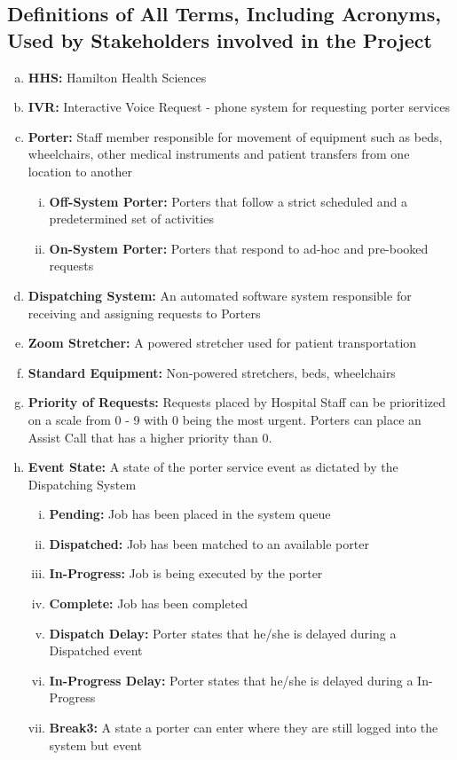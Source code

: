 \documentclass[paper=letter, fontsize=10pt]{scrartcl}
\numberwithin{equation}{section}		%
\numberwithin{figure}{section}			%
\numberwithin{table}{section}				%
\begin{document}
\subsection{Definitions of All Terms, Including Acronyms, Used by Stakeholders involved in the Project}
\begin{enumerate}[(a)]
	\item \textbf{HHS:} Hamilton Health Sciences
	\item \textbf{IVR:} Interactive Voice Request - phone system for requesting porter services
	\item \textbf{Porter:} Staff member responsible for movement of equipment such as beds, wheelchairs, other medical instruments and patient transfers from one location to another
	\begin{enumerate}[(i)]
		\item \textbf{Off-System Porter:} Porters that follow a strict scheduled and a predetermined set of activities
		\item \textbf{On-System Porter:} Porters that respond to ad-hoc and pre-booked requests	
	\end{enumerate}
	\item \textbf{Dispatching System:} An automated software system responsible for receiving and assigning requests to Porters
	\item \textbf{Zoom Stretcher:} A powered stretcher used for patient transportation
	\item \textbf{Standard Equipment:} Non-powered stretchers, beds, wheelchairs
	\item \textbf{Priority of Requests:} Requests placed by Hospital Staff can be prioritized on a scale from 0 - 9 with 0 being the most urgent. Porters can place an Assist Call that has a higher priority than 0.
	\item \textbf{Event State:} A state of the porter service event as dictated by the Dispatching System
	\begin{enumerate}[(i)]
		\item \textbf{Pending:} Job has been placed in the system queue
		\item \textbf{Dispatched:} Job has been matched to an available porter
		\item \textbf{In-Progress:} Job is being executed by the porter
		\item \textbf{Complete:} Job has been completed
		\item \textbf{Dispatch Delay:} Porter states that he/she is delayed during a Dispatched event
		\item \textbf{In-Progress Delay:} Porter states that he/she is delayed during a In-Progress				\item \textbf{Break3:} A state a porter can enter where they are still logged into the system but event

\end{enumerate}
\end{enumerate}
\end{document}
